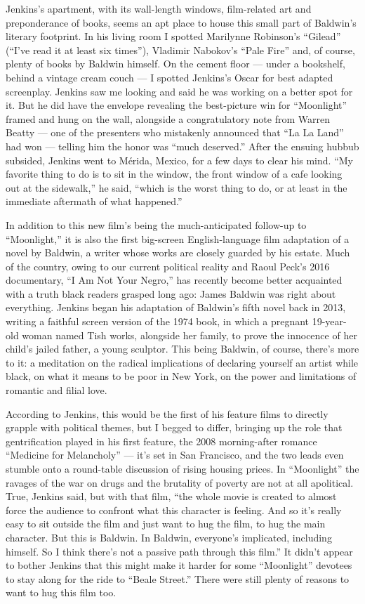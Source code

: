 Jenkins's apartment, with its wall-length windows, film-related art and
preponderance of books, seems an apt place to house this small part of
Baldwin's literary footprint. In his living room I spotted Marilynne
Robinson's ``Gilead'' (``I've read it at least six times''), Vladimir
Nabokov's ``Pale Fire'' and, of course, plenty of books by Baldwin
himself. On the cement floor --- under a bookshelf, behind a vintage
cream couch --- I spotted Jenkins's Oscar for best adapted screenplay.
Jenkins saw me looking and said he was working on a better spot for it.
But he did have the envelope revealing the best-picture win for
``Moonlight'' framed and hung on the wall, alongside a congratulatory
note from Warren Beatty --- one of the presenters who mistakenly
announced that ``La La Land'' had won --- telling him the honor was
``much deserved.'' After the ensuing hubbub subsided, Jenkins went to
Mérida, Mexico, for a few days to clear his mind. ``My favorite thing to
do is to sit in the window, the front window of a cafe looking out at
the sidewalk,'' he said, ``which is the worst thing to do, or at least
in the immediate aftermath of what happened.''

In addition to this new film's being the much-anticipated follow-up to
``Moonlight,'' it is also the first big-screen English-language film
adaptation of a novel by Baldwin, a writer whose works are closely
guarded by his estate. Much of the country, owing to our current
political reality and Raoul Peck's 2016 documentary, ``I Am Not Your
Negro,'' has recently become better acquainted with a truth black
readers grasped long ago: James Baldwin was right about everything.
Jenkins began his adaptation of Baldwin's fifth novel back in 2013,
writing a faithful screen version of the 1974 book, in which a pregnant
19-year-old woman named Tish works, alongside her family, to prove the
innocence of her child's jailed father, a young sculptor. This being
Baldwin, of course, there's more to it: a meditation on the radical
implications of declaring yourself an artist while black, on what it
means to be poor in New York, on the power and limitations of romantic
and filial love.

According to Jenkins, this would be the first of his feature films to
directly grapple with political themes, but I begged to differ, bringing
up the role that gentrification played in his first feature, the 2008
morning-after romance ``Medicine for Melancholy'' --- it's set in San
Francisco, and the two leads even stumble onto a round-table discussion
of rising housing prices. In ``Moonlight'' the ravages of the war on
drugs and the brutality of poverty are not at all apolitical. True,
Jenkins said, but with that film, ``the whole movie is created to almost
force the audience to confront what this character is feeling. And so
it's really easy to sit outside the film and just want to hug the film,
to hug the main character. But this is Baldwin. In Baldwin, everyone's
implicated, including himself. So I think there's not a passive path
through this film.'' It didn't appear to bother Jenkins that this might
make it harder for some ``Moonlight'' devotees to stay along for the
ride to ``Beale Street.'' There were still plenty of reasons to want to
hug this film too.

